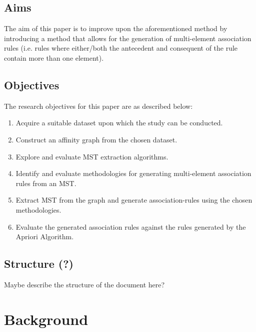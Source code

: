 \documentclass[paper=a4,fontsize=11pt]{report}	%
\begin{document}
\section{Aims}
The aim of this paper is to improve upon the aforementioned method by introducing a method that allows for the generation of multi-element association rules (i.e. rules where either/both the antecedent and consequent of the rule contain more than one element).

\section{Objectives}
The research objectives for this paper are as described below:
\begin{enumerate}
\item Acquire a suitable dataset upon which the study can be conducted.
\item Construct an affinity graph from the chosen dataset.
\item Explore and evaluate MST extraction algorithms.
\item Identify and evaluate methodologies for generating multi-element association rules from an MST.
\item Extract MST from the graph and generate association-rules using the chosen methodologies.
\item Evaluate the generated association rules against the rules generated by the Apriori Algorithm.
\end{enumerate}

\section{Structure (?)}
Maybe describe the structure of the document here?

\chapter{Background}
\end{document}
